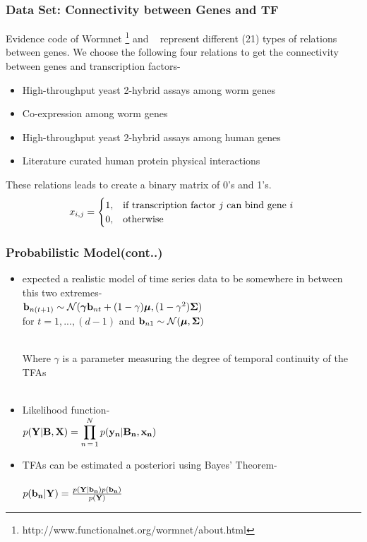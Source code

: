 \documentclass{beamer}
\begin{document}
\begin{frame}
\frametitle{Data Set: Connectivity between Genes and TF}
Evidence code of Wormnet \footnote{http://www.functionalnet.org/wormnet/about.html} and ~\cite{p5} represent {\color{blue} different (21) types of relations} between genes.
We choose the following four relations to get the connectivity between genes and transcription factors-
\begin{itemize}
	  \item High-throughput yeast 2-hybrid assays among worm genes
	  \item Co-expression among worm genes
	  \item High-throughput yeast 2-hybrid assays among human genes
	  \item Literature curated human protein physical interactions 
\end{itemize} 

These relations leads to create a {\color{red} binary matrix} of {\color{blue} 0}'s and {\color{blue} 1}'s. 
\[
    x_{i,j}= 
\begin{cases}
    1,& \text{if } $\text {transcription factor $j$ can bind gene $i$ }$\\
    0,              & \text{otherwise}
\end{cases}
\] 
\end{frame}



\begin{frame}
\frametitle{Probabilistic Model(cont..)}

\begin{itemize}
\item  \cite{p2}  expected a realistic model of time series data to be somewhere in between this two extremes- \\
\centering $ \bold{b}_{n(t+1)} \sim \mathcal{N} (\boldsymbol{\gamma}\bold{b}_{nt} + (1-\gamma)\boldsymbol{\mu},(1-\gamma^2)\boldsymbol{\Sigma})$ \\
for $ t= 1, ... , (d-1)$ and $ \bold{b}_{n1} \sim \mathcal{N} ( \boldsymbol{\mu},\boldsymbol{\Sigma})$
\raggedright
\\ Where $ \gamma $ is a parameter measuring the degree of temporal continuity of the TFAs \\~\\

\item Likelihood function-\\
\centering 
$p(\bold{Y|B,X})= \displaystyle \prod_{n \mathop = 1}^{N} p(\bold{y_n|B_n,x_n})$

\raggedright
\item TFAs can be estimated a posteriori using Bayes' Theorem- \\~\\
\centering 
$ p(\bold{b_n|Y})= \frac {p(\bold{Y|b_n})p(\bold{b_n})}{p(\bold{Y})} $

\end {itemize}
\end{frame}
\end{document}
